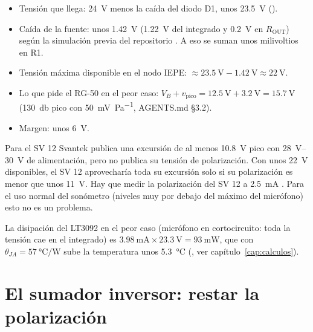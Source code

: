 \begin{calculo}
\begin{itemize}
  \item Tensión que llega: \SI{24}{\volt} menos la caída del diodo D1, unos \SI{23.5}{\volt} ().
  \item Caída de la fuente: unos \SI{1.42}{\volt} (\SI{1.22}{\volt} del integrado y \SI{0.2}{\volt} en
        $R_{\mathrm{OUT}}$) según la simulación previa del repositorio \estimado. A eso se suman unos milivoltios en R1.
  \item Tensión máxima disponible en el nodo IEPE: $\approx \SI{23.5}{\volt} - \SI{1.42}{\volt} \approx \SI{22}{\volt}$.
  \item Lo que pide el RG-50 en el peor caso: $V_B + v_{\mathrm{pico}} = \SI{12.5}{\volt} + \SI{3.2}{\volt}
        = \SI{15.7}{\volt}$ (\SI{130}{\decibel} pico con \SI{50}{\milli\volt\per\pascal}, AGENTS.md §3.2).
  \item Margen: unos \SI{6}{\volt}.
\end{itemize}
\end{calculo}

\begin{ojo}
Para el SV 12 Svantek publica una excursión de al menos \SI{10.8}{\volt} pico con \SIrange{28}{30}{\volt} de
alimentación, pero no publica su tensión de polarización. Con unos \SI{22}{\volt} disponibles, el SV 12 aprovecharía
toda su excursión solo si su polarización es menor que unos \SI{11}{\volt}. Hay que medir la polarización del SV 12 a
\SI{2.5}{\milli\ampere} \medir. Para el uso normal del sonómetro (niveles muy por debajo del máximo del micrófono) esto
no es un problema.
\end{ojo}

La disipación del LT3092 en el peor caso (micrófono en cortocircuito: toda la tensión cae en el integrado) es
$\SI{3.98}{\milli\ampere}\times\SI{23.3}{\volt} = \SI{93}{\milli\watt}$, que con $\theta_{JA} = \SI{57}{\degreeCelsius\per\watt}$
\copia{} sube la temperatura unos \SI{5.3}{\degreeCelsius} (, ver
capítulo~\ref{cap:calculos}).

\section{El sumador inversor: restar la polarización}\label{sec:c03-sumador}

